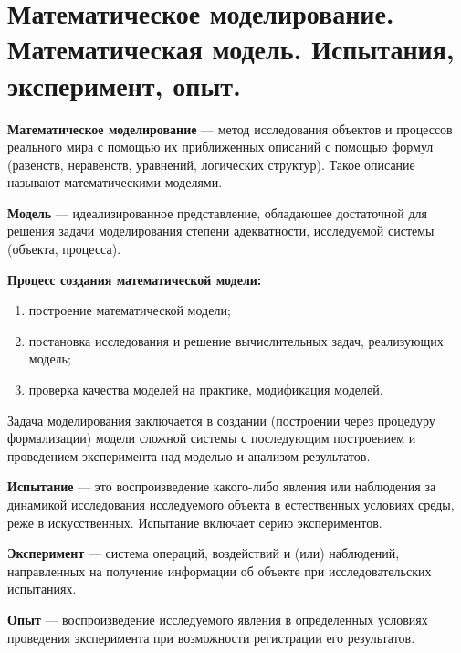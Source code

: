 \section{Математическое моделирование. Математическая модель. Испытания, эксперимент, опыт.}

\textbf{Математическое моделирование} — метод исследования объектов и процессов реального мира с помощью их приближенных описаний с помощью формул (равенств, неравенств, уравнений, логических структур). Такое описание называют математическими моделями.

\textbf{Модель} — идеализированное представление, обладающее достаточной для решения задачи моделирования степени адекватности, исследуемой системы (объекта, процесса).

\textbf{Процесс создания математической модели:}
\begin{enumerate}
  \item построение математической модели;
  \item постановка исследования и решение вычислительных задач, реализующих модель;
  \item проверка качества моделей на практике, модификация моделей.
\end{enumerate}

Задача моделирования заключается в создании (построении через процедуру формализации) модели сложной системы с последующим построением и проведением эксперимента над моделью и анализом результатов.

\textbf{Испытание} — это воспроизведение какого-либо явления или наблюдения за динамикой исследования исследуемого объекта в естественных условиях среды, реже в искусственных. Испытание включает серию экспериментов.

\textbf{Эксперимент} — система операций, воздействий и (или) наблюдений, направленных на получение информации об объекте при исследовательских испытаниях.

\textbf{Опыт} — воспроизведение исследуемого явления в определенных условиях проведения эксперимента при возможности регистрации его результатов.

\clearpage
